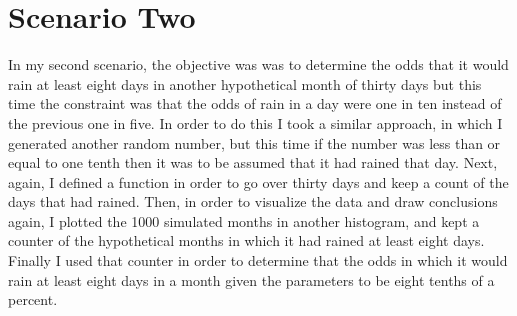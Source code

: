 \documentclass[twocolumn]{revtex4}
\begin{document}
\section{Scenario Two}
In my second scenario, the objective was was to determine the odds that it would rain at least eight days in another hypothetical month of thirty days but this time the constraint was that the odds of rain in a day were one in ten instead of the previous one in five. In order to do this I took a similar approach, in which I generated another random number, but this time if the number was less than or equal to one tenth then it was to be assumed that it had rained that day. Next, again, I defined a function in order to go over thirty days and keep a count of the days that had rained. Then, in order to visualize the data and draw conclusions again, I plotted the 1000 simulated months in another histogram, and kept a counter of the hypothetical months in which it had rained at least eight days. Finally I used that counter in order to determine that the odds in which it would rain at least eight days in a month given the parameters to be eight tenths of a percent.
\end{document}
